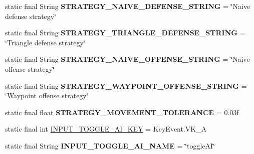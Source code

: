 \begin{DoxyCompactItemize}
\item 
\hypertarget{classairhockeyjava_1_1game_1_1_constants_a6fdf1ac848d8b415e268da9c8e057edf}{}static final String {\bfseries S\+T\+R\+A\+T\+E\+G\+Y\+\_\+\+N\+A\+I\+V\+E\+\_\+\+D\+E\+F\+E\+N\+S\+E\+\_\+\+S\+T\+R\+I\+N\+G} = \char`\"{}Naive defense strategy\char`\"{}\label{classairhockeyjava_1_1game_1_1_constants_a6fdf1ac848d8b415e268da9c8e057edf}

\item 
\hypertarget{classairhockeyjava_1_1game_1_1_constants_a41966ae27c4998c50272839fb4fcff4c}{}static final String {\bfseries S\+T\+R\+A\+T\+E\+G\+Y\+\_\+\+T\+R\+I\+A\+N\+G\+L\+E\+\_\+\+D\+E\+F\+E\+N\+S\+E\+\_\+\+S\+T\+R\+I\+N\+G} = \char`\"{}Triangle defense strategy\char`\"{}\label{classairhockeyjava_1_1game_1_1_constants_a41966ae27c4998c50272839fb4fcff4c}

\item 
\hypertarget{classairhockeyjava_1_1game_1_1_constants_a6fb46423b19bc060e045898e14d07e82}{}static final String {\bfseries S\+T\+R\+A\+T\+E\+G\+Y\+\_\+\+N\+A\+I\+V\+E\+\_\+\+O\+F\+F\+E\+N\+S\+E\+\_\+\+S\+T\+R\+I\+N\+G} = \char`\"{}Naive offense strategy\char`\"{}\label{classairhockeyjava_1_1game_1_1_constants_a6fb46423b19bc060e045898e14d07e82}

\item 
\hypertarget{classairhockeyjava_1_1game_1_1_constants_a3777f8d4939053a090393f1ec1e3fb39}{}static final String {\bfseries S\+T\+R\+A\+T\+E\+G\+Y\+\_\+\+W\+A\+Y\+P\+O\+I\+N\+T\+\_\+\+O\+F\+F\+E\+N\+S\+E\+\_\+\+S\+T\+R\+I\+N\+G} = \char`\"{}Waypoint offense strategy\char`\"{}\label{classairhockeyjava_1_1game_1_1_constants_a3777f8d4939053a090393f1ec1e3fb39}

\item 
\hypertarget{classairhockeyjava_1_1game_1_1_constants_ad0733594a133f24d2b0becf0e537cd76}{}static final float {\bfseries S\+T\+R\+A\+T\+E\+G\+Y\+\_\+\+M\+O\+V\+E\+M\+E\+N\+T\+\_\+\+T\+O\+L\+E\+R\+A\+N\+C\+E} = 0.\+03f\label{classairhockeyjava_1_1game_1_1_constants_ad0733594a133f24d2b0becf0e537cd76}

\item 
static final int \hyperlink{classairhockeyjava_1_1game_1_1_constants_ab483689ae0c655a4b406668de76a1d26}{I\+N\+P\+U\+T\+\_\+\+T\+O\+G\+G\+L\+E\+\_\+\+A\+I\+\_\+\+K\+E\+Y} = Key\+Event.\+V\+K\+\_\+\+A
\item 
\hypertarget{classairhockeyjava_1_1game_1_1_constants_a4df447e3c0a3e18ad36296a1e6868002}{}static final String {\bfseries I\+N\+P\+U\+T\+\_\+\+T\+O\+G\+G\+L\+E\+\_\+\+A\+I\+\_\+\+N\+A\+M\+E} = \char`\"{}toggle\+A\+I\char`\"{}\label{classairhockeyjava_1_1game_1_1_constants_a4df447e3c0a3e18ad36296a1e6868002}


\end{DoxyCompactItemize}
